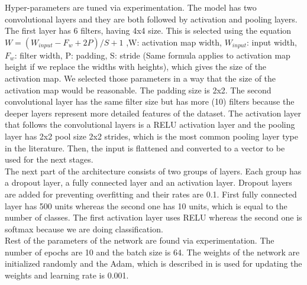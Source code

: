 \documentclass[acmtog, authorversion]{acmart}
\begin{document}
Hyper-parameters are tuned via experimentation. The model has two convolutional layers and they are both followed by activation and pooling layers. The first layer has 6 filters, having 4x4 size. This is selected using the 
equation $W=(W_{input}-F_{w}+2P)/S+1$ ,W: activation map width, $W_{input}$: input width, $F_{w}$: filter width, P: padding, S: stride (Same formula applies
to activation map height if we replace the widths with heights), which gives the size of the activation map. We selected those parameters in a way that 
the size of the activation map would be reasonable. The padding size is 2x2. 
The second convolutional layer has the same filter size but has more (10) filters because the deeper layers represent more detailed features of the dataset.  The activation 
layer that follows the convolutional layers is a RELU activation layer and the pooling layer has 2x2 pool size 2x2 strides, which is the most common pooling 
layer type in the literature. Then, the input is flattened and converted to a vector to be used for the next stages.\\
The next part of the architecture consists of two groups of layers. Each group has a dropout layer, a fully connected layer and an activation layer.
Dropout layers are added for preventing overfitting and their rates are 0.1. First fully connected layer has 500 units whereas the second one has 10 units, which
is equal to the number of classes. The first activation layer uses RELU whereas the second one is softmax because we are doing classification.\\
Rest of the parameters of the network are found via experimentation. The number of epochs are 10 and the batch size is 64. The weights of the network are 
initialized randomly and the Adam, which is described in \cite{kingma2014adam} is used for updating the weights and learning rate is 0.001. \\
\end{document}
